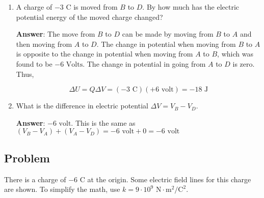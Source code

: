 \documentclass{article}
\begin{document}
\begin{enumerate}
        \vskip 48pt
        \fi

  \item A charge of $-3\text{ C}$ is moved from $B$ to $D$. By how much has the electric potential energy of the moved charge changed?

        \ifsolutions
        {\bf Answer}: The move from $B$ to $D$ can be made by moving from $B$ to $A$ and then moving from $A$ to $D$. The change in potential when moving from $B$ to $A$ is opposite to the change in potential when moving from $A$ to $B$, which was found to be $-6\text{ Volts}$. The change in potential in going from $A$ to $D$ is zero. Thus,

        $$
         \Delta U = Q\Delta V=(-3\text{ C})(+6\text{ volt})=-18\text{ J}
        $$
        \else

        \vskip 48pt
        \fi

  \item What is the difference in electric potential $\Delta V = V_B-V_D$.

        \ifsolutions
        {\bf Answer}: $-6\text{ volt}$. This is the same as $(V_B - V_A) + (V_A - V_D) = -6\text{ volt} + 0 = -6\text{ volt}$
        \else

        \vskip 48pt
        \fi

\end{enumerate}

\newpage

\subsection{Problem}

There is a charge of $-6\text{ C}$ at the origin. Some electric field lines for this charge are shown. To simplify the math, use $k=9\cdot 10^9\text{ N}\cdot\text{m}^2/\text{C}^2$.


\end{document}
